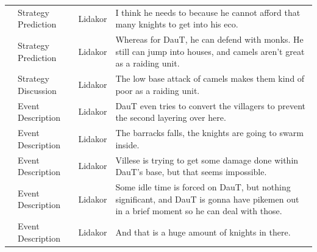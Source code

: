 {\begin{longtable}{@{}>{\theAppRow}r|L{2.3cm}L{1.0cm}U{11.55cm}@{}}
    & Strategy Prediction   & Lidakor & I think he needs to because he cannot afford that many knights to get into his eco.                                                                                                                                                                                                             \\
    & Strategy Prediction   & Lidakor & Whereas for DauT, he can defend with monks. He still can jump into houses, and camels aren't great as a raiding unit.                                                                                                                                                                           \\
    & Strategy Discussion   & Lidakor & The low base attack of camels makes them kind of poor as a raiding unit.                                                                                                                                                                                                                        \\
    & Event Description     & Lidakor & DauT even tries to convert the villagers to prevent the second layering over here.                                                                                                                                                                                                              \\
    & Event Description     & Lidakor & The barracks falls, the knights are going to swarm inside.                                                                                                                                                                                                                                      \\
    & Event Description     & Lidakor & Villese is trying to get some damage done within DauT's base, but that seems impossible.                                                                                                                                                                                                        \\
    & Event Description     & Lidakor & Some idle time is forced on DauT, but nothing significant, and DauT is gonna have pikemen out in a brief moment so he can deal with those.                                                                                                                                                      \\
    & Event Description     & Lidakor & And that is a huge amount of knights in there.                                                                                                                                                                                                                                                  \\

\end{longtable}}
